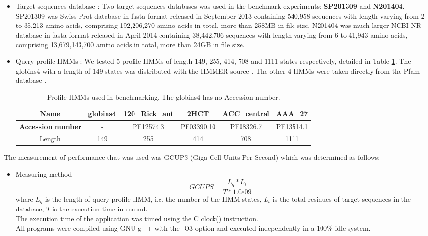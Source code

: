 \begin{itemize}
 \item Target sequences database : Two target sequences databases was used in the benchmark experiments: \textbf{SP201309} and \textbf{N201404}. SP201309 was Swiss-Prot database in fasta format released in September 2013 \citep{UniProt} containing 540,958 sequences with length varying from 2 to 35,213 amino acids, comprising 192,206,270 amino acids in total, more than 258MB in file size. N201404 was much larger NCBI NR database in fasta format released in April 2014 \citep{NCBI} containing 38,442,706 sequences with length varying from 6 to 41,943 amino acids, comprising 13,679,143,700 amino acids in total, more than 24GB in file size.
 \item Query profile HMMs : We tested 5 profile HMMs of length 149, 255, 414, 708 and 1111 states respectively, detailed in Table \ref{tab.phmms}. The globins4 with a length of 149 states was distributed with the HMMER source \citep{Hsource}. The other 4 HMMs were taken directly from the Pfam database \citep{Pfam}.\\
 \begin{table}[H]
 \centering
 \begin{tabular}{|c|c|c|c|c|c|}\hline
 \textbf{Name} & globins4 & 120\_Rick\_ant & 2HCT & ACC\_central & AAA\_27 \\\hline
 \textbf{Accession number} & - & PF12574.3 & PF03390.10 & PF08326.7 & PF13514.1 \\\hline
 Length & 149 & 255 & 414 & 708 & 1111 \\\hline
 \end{tabular}
 \caption{\selectfont Profile HMMs used in benchmarking. \label{tab.phmms} The globins4 has no Accession number.}
 \end{table}
\end{itemize}

The measurement of performance that was used was GCUPS (Giga Cell Units Per Second) which was determined as follows:

\begin{itemize}
 \item Measuring method\\ 
 \begin{equation*}
   GCUPS = \frac{L_q * L_t}{T * 1.0e09}
 \end{equation*}
 where $L_q$ is the length of query profile HMM, i.e. the number of the HMM states, $L_t$ is the total residues of target sequences in the database, $T$ is the execution time in second.\\ 
 The execution time of the application was timed using the C clock() instruction.\\
 All programs were compiled using GNU g++ with the -O3 option and executed independently in a 100\% idle system.
\end{itemize}

